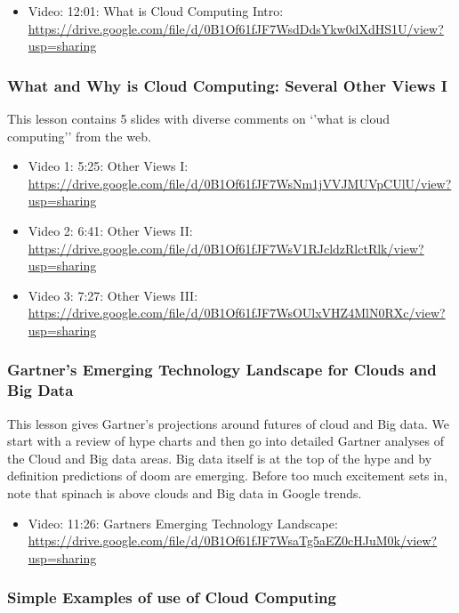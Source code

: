 \begin{itemize}
\tightlist
\item
  Video: 12:01: What is Cloud Computing Intro:
  \url{https://drive.google.com/file/d/0B1Of61fJF7WsdDdsYkw0dXdHS1U/view?usp=sharing}
\end{itemize}

\subsubsection{What and Why is Cloud Computing: Several Other Views
I}\label{what-and-why-is-cloud-computing-several-other-views-i}

This lesson contains 5 slides with diverse comments on `'what is cloud
computing'' from the web.

\begin{itemize}
\tightlist
\item
  Video 1: 5:25: Other Views I:
  \url{https://drive.google.com/file/d/0B1Of61fJF7WsNm1jVVJMUVpCUlU/view?usp=sharing}
\item
  Video 2: 6:41: Other Views II:
  \url{https://drive.google.com/file/d/0B1Of61fJF7WsV1RJcldzRlctRlk/view?usp=sharing}
\item
  Video 3: 7:27: Other Views III:
  \url{https://drive.google.com/file/d/0B1Of61fJF7WsOUlxVHZ4MlN0RXc/view?usp=sharing}
\end{itemize}

\subsubsection{Gartner's Emerging Technology Landscape for Clouds and
Big
Data}\label{gartners-emerging-technology-landscape-for-clouds-and-big-data}

This lesson gives Gartner's projections around futures of cloud and Big
data. We start with a review of hype charts and then go into detailed
Gartner analyses of the Cloud and Big data areas. Big data itself is at
the top of the hype and by definition predictions of doom are emerging.
Before too much excitement sets in, note that spinach is above clouds
and Big data in Google trends.

\begin{itemize}
\tightlist
\item
  Video: 11:26: Gartners Emerging Technology Landscape:
  \url{https://drive.google.com/file/d/0B1Of61fJF7WsaTg5aEZ0cHJuM0k/view?usp=sharing}
\end{itemize}

\subsubsection{Simple Examples of use of Cloud
Computing}\label{simple-examples-of-use-of-cloud-computing}

